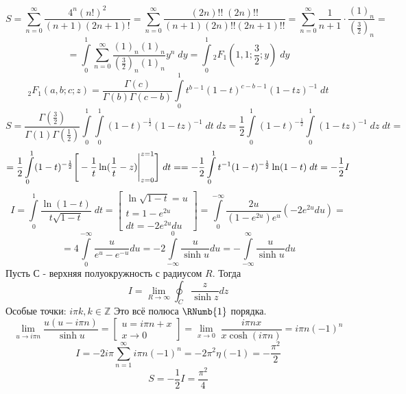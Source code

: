 


	$$S = \sum_{n = 0}^{\infty} \frac{4^n (n!)^2}{(n+1)(2n+1)!} = \sum_{n = 0}^{\infty} \frac{(2n)!! \; (2n)!!}{(n+1) (2n)!! (2n+1)!!} = \sum_{n = 0}^{\infty} \frac{1}{n+1} \cdot \frac{(1)_n}{(\frac{3}{2})_n} =$$
	$$= \int \limits_0^1 \sum_{n = 0}^{\infty} \frac{(1)_n (1)_n}{(\frac{3}{2})_n (1)_n} y^n \; dy = \int \limits_0^1 {}_2F_1 (1, 1; \frac{3}{2}; y) \; dy$$
	$${}_2F_1 (a, b; c; z) = \frac{\Gamma(c)}{\Gamma(b) \Gamma(c-b)} \int \limits_0^1 t^{b-1} (1-t)^{c-b-1} (1-tz)^{-1}\; dt$$
	$$S = \frac{\Gamma(\frac{3}{2})}{\Gamma(1) \Gamma(\frac{1}{2})} \int \limits_0^1 \int \limits_0^1 (1-t)^{-\frac{1}{2}} (1-tz)^{-1}\; dt \; dz = \frac{1}{2} \int \limits_0^1 (1-t)^{-\frac{1}{2}} \int \limits_0^1 (1-tz)^{-1} \; dz \; dt =$$
	$$= \frac{1}{2} \int \limits_0^1 (1-t)^{-\frac{1}{2}} \Bigg{[} -\frac{1}{t} \ln(\frac{1}{t} - z) \Bigg|_{z = 0}^{z = 1} \Bigg{]} \; dt = = -\frac{1}{2} \int \limits_0^1 t^{-1} (1-t)^{-\frac{1}{2}} \ln(1-t) \; dt = -\frac{1}{2} I$$
	$$I = \int \limits_0^1 \frac{\ln (1-t)}{t \sqrt{1-t}} \; dt = \left[ \begin{array}{c} \ln\sqrt{1-t} = u \\ t = 1-e^{2u} \\  dt = -2e^{2u} du\end{array} \right] = \int \limits_0^{-\infty} \frac{2u}{(1-e^{2u})e^u} (-2e^{2u} du) = $$
	$$= 4 \int \limits_0^{-\infty} \frac{u}{e^u-e^{-u}} du = -2 \int \limits_{-\infty}^{0} \frac{u}{\sinh u} du = -\int \limits_{-\infty}^{\infty} \frac{u}{\sinh u} du $$
	Пусть С - верхняя полуокружность с радиусом $R$. Тогда
	$$I= \lim_{R \to \infty}\oint_C \frac{z}{\sinh z} dz $$
	Особые точки: $i\pi k , k \in \mathbb{Z}$
	\newline
	Это всё полюса $\RNumb{1}$ порядка.
	$$\lim_{u \to i\pi n} \frac{u(u-i\pi n)}{\sinh u} = \left[ \begin{array}{c} u = i\pi n + x \\ x \to 0 \end{array} \right] = \lim_{x \to 0} \; \frac{i\pi n x}{x\cosh(i\pi n)} = i\pi n (-1)^n$$
	$$I = -2i\pi \sum_{n= 1}^{\infty} i\pi n (-1)^n = -2\pi^2 \eta(-1) = -\frac{\pi^2}{2} $$
	$$S = -\frac{1}{2} I = \frac{\pi^2}{4}$$
